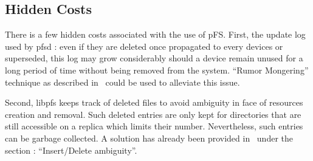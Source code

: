 

\subsection{Hidden Costs}

There is a few hidden costs associated with the use of pFS. First, the
update log used by pfsd : even if they are deleted once propagated to
every devices or superseded, this log may grow considerably should a
device remain unused for a long period of time without being removed
from the system. ``Rumor Mongering'' technique as described
in~\cite{demers:epidemic} could be used to alleviate this issue.

Second, libpfs keeps track of deleted files to avoid ambiguity in face
of resources creation and removal. Such deleted entries are only kept
for directories that are still accessible on a replica which limits
their number. Nevertheless, such entries can be garbage collected. A
solution has already been provided in~\cite{page:ficus} under the
section : ``Insert/Delete ambiguity''.

\endinput


